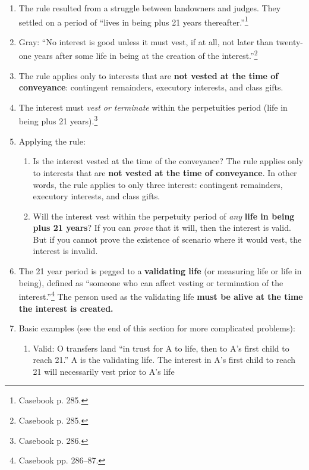 \begin{enumerate}
    \item The rule resulted from a struggle between landowners and judges. 
    They settled on a period of ``lives in being plus 21 years 
    thereafter.''\footnote{Casebook p. 285.}
    \item Gray: ``No interest is good unless it must vest, if at all, not 
    later than twenty-one years after some life in being at the creation of 
    the interest.''\footnote{Casebook p. 285.}
    \item The rule applies only to interests that are \textbf{not vested at 
    the time of conveyance}: contingent remainders, executory 
    interests, and class gifts.
    \item The interest must \emph{vest or terminate} within the perpetuities 
    period (life in being plus 21 years).\footnote{Casebook p. 286.}
    \item Applying the rule:
    \begin{enumerate}
        \item Is the interest vested at the time of the conveyance? The rule 
        applies only to interests that are \textbf{not vested at the time of 
        conveyance}. In other words, the rule applies to only three interest: 
        contingent remainders, executory interests, and class gifts.
        \item Will the interest vest within the perpetuity period of 
        \emph{any} \textbf{life in being plus 21 years}? If you can 
        \emph{prove} that it will, then the interest is valid. But if you 
        cannot prove the existence of scenario where it would vest, the 
        interest is invalid.
    \end{enumerate}
    \item The 21 year period is pegged to a \textbf{validating life} (or 
    measuring life or life in being), defined as ``someone who can affect 
    vesting or termination of the interest.''\footnote{Casebook pp. 286--87.} 
    The person used as the validating life \textbf{must be alive at the time 
    the interest is created.}
    \item Basic examples (see the end of this section for more complicated 
    problems):
    \begin{enumerate}
        \item Valid: O transfers land ``in trust for A to life, then to A's 
        first child to reach 21.'' A is the validating life. The interest in 
        A's first child to reach 21 will necessarily vest prior to A's life 

\end{enumerate}
\end{enumerate}
